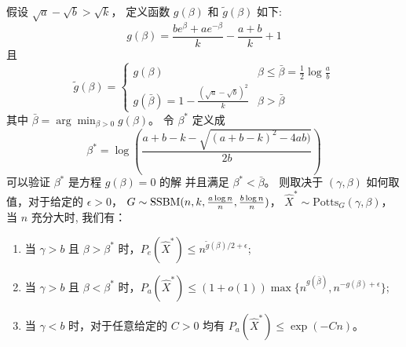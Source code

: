 \begin{theorem}\label{thm:phase_transition}
	假设 $\sqrt{a} - \sqrt{b} > \sqrt{k}$，
	定义函数 $g(\beta)$ 和 $ \tilde{g}(\beta)$ 如下:
	\begin{equation}
		\label{eq:g_beta_main_article}
		g(\beta) = \frac{be^{\beta} + a e^{-\beta}}{k} - \frac{a+b}{k} +1
	\end{equation}
	且
	\begin{equation}
		\label{eq:g_tilde_beta_main_article}
	\tilde{g}(\beta) = \begin{cases}
	g(\beta) & \beta \leq \bar{\beta} = \frac{1}{2}\log \frac{a}{b} \\
	g(\bar{\beta}) = 1 - \frac{(\sqrt{a} - \sqrt{b})^2}{k} & \beta > \bar{\beta}
	\end{cases}
	\end{equation}
	其中
	$\bar{\beta} =  \displaystyle\arg\min_{\beta > 0} g(\beta)$。
	令 $\beta^*$ 定义成
	\begin{equation}\label{eq:beta_star}
	\beta^* = \log\left(\frac{a + b - k - \sqrt{(a + b - k)^2 - 4 a b)}}{2  b}\right)
	\end{equation}
	可以验证 $\beta^*$ 是方程 $g(\beta) = 0$ 的解 并且满足  $\beta^* < \bar{\beta}$。
	则取决于 $(\gamma, \beta)$ 如何取值，对于给定的 $\epsilon > 0$， 
	$G\sim \operatorname{SSBM}(n, k, \frac{a \log n}{n}, \frac{b \log n}{n})$， $\hat{X}^* \sim \textrm{Potts}_G(\gamma, \beta)$，
	当 $n$ 充分大时, 我们有：
	\begin{enumerate}
	\item 当 $\gamma > b$ 且 $\beta > \beta^*$ 时，$P_e(\hat{X}^*) \leq n^{\tilde{g}(\beta)/2 + \epsilon}$;
	\item 当 $\gamma > b$ 且 $\beta < \beta^*$ 时，$P_a(\hat{X}^*) \leq (1+o(1))\max\{n^{g(\bar{\beta})}, n^{-g(\beta) + \epsilon}\}$;
	\item 当 $\gamma < b$ 时，对于任意给定的 $C>0$	均有 $P_a(\hat{X}^*) \leq \exp(-C n)$。
	\end{enumerate}
\end{theorem}

